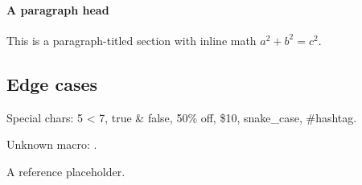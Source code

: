 \documentclass{article}
\begin{document}
\paragraph{A paragraph head} This is a paragraph-titled section with inline math $a^2 + b^2 = c^2$.

\subsection{Edge cases}

Special chars: 5 < 7, true \& false, 50\% off, \$10, snake\_case, \#hashtag.

Unknown macro: .

\cite{einstein1905} A reference placeholder.
\end{document}
